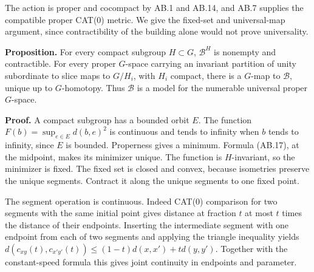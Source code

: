 \documentclass[
  11pt,
]{article}
\begin{document}
The action is proper and cocompact by AB.1 and AB.14, and AB.7 supplies
the compatible proper CAT(0) metric. We give the fixed-set and
universal-map argument, since contractibility of the building alone
would not prove universality.

\textbf{Proposition.} For every compact subgroup \(H\subset G\),
\(\mathcal B^H\) is nonempty and contractible. For every proper
\(G\)-space carrying an invariant partition of unity subordinate to
slice maps to \(G/H_i\), with \(H_i\) compact, there is a \(G\)-map to
\(\mathcal B\), unique up to \(G\)-homotopy. Thus \(\mathcal B\) is a
model for the numerable universal proper \(G\)-space.

\textbf{Proof.} A compact subgroup has a bounded orbit \(E\). The
function \(F(b)=\sup_{e\in E}d(b,e)^2\) is continuous and tends to
infinity when \(b\) tends to infinity, since \(E\) is bounded.
Properness gives a minimum. Formula (AB.17), at the midpoint, makes its
minimizer unique. The function is \(H\)-invariant, so the minimizer is
fixed. The fixed set is closed and convex, because isometries preserve
the unique segments. Contract it along the unique segments to one fixed
point.

The segment operation is continuous. Indeed CAT(0) comparison for two
segments with the same initial point gives distance at fraction \(t\) at
most \(t\) times the distance of their endpoints. Inserting the
intermediate segment with one endpoint from each of two segments and
applying the triangle inequality yields
\(d(c_{xy}(t),c_{x'y'}(t))\le(1-t)d(x,x')+t d(y,y')\). Together with the
constant-speed formula this gives joint continuity in endpoints and
parameter.
\end{document}

